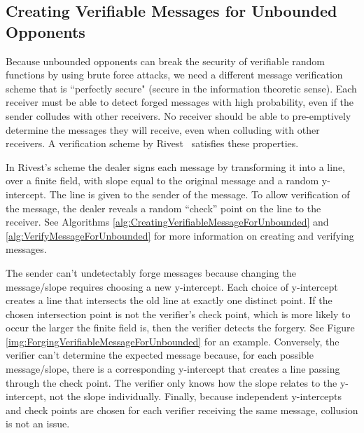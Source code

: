 \documentclass[12pt]{dalcsthesis}
\begin{document}
\subsection{Creating Verifiable Messages for Unbounded Opponents}
\label{sec:vermes}

Because unbounded opponents can break the security of verifiable random functions by using brute force attacks, we need a different message verification scheme that is ``perfectly secure" (secure in the information theoretic sense). Each receiver must be able to detect forged messages with high probability, even if the sender colludes with other receivers. No receiver should be able to pre-emptively determine the messages they will receive, even when colluding with other receivers. A verification scheme by Rivest~\cite{rivest99} satisfies these properties.

In Rivest's scheme the dealer signs each message by transforming it into a line, over a finite field, with slope equal to the original message and a random y-intercept. The line is given to the sender of the message. To allow verification of the message, the dealer reveals a random ``check'' point on the line to the receiver. See Algorithms \ref{alg:CreatingVerifiableMessageForUnbounded} and \ref{alg:VerifyMessageForUnbounded} for more information on creating and verifying messages.

The sender can't undetectably forge messages because changing the message/slope requires choosing a new y-intercept. Each choice of y-intercept creates a line that intersects the old line at exactly one distinct point. If the chosen intersection point is not the verifier's check point, which is more likely to occur the larger the finite field is, then the verifier detects the forgery. See Figure \ref{img:ForgingVerifiableMessageForUnbounded} for an example. Conversely, the verifier can't determine the expected message because, for each possible message/slope, there is a corresponding y-intercept that creates a line passing through the check point. The verifier only knows how the slope relates to the y-intercept, not the slope individually. Finally, because independent y-intercepts and check points are chosen for each verifier receiving the same message, collusion is not an issue.
\end{document}

